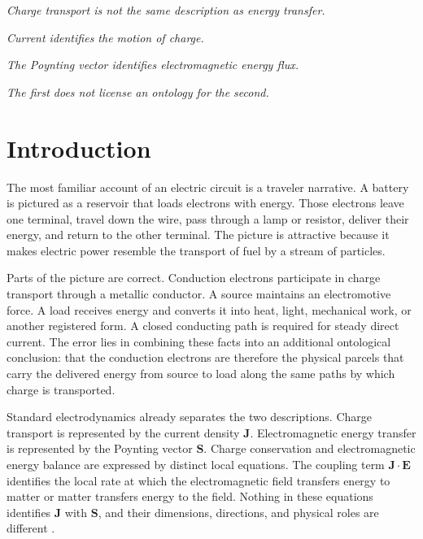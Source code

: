 \documentclass[12pt,onecolumn]{article}
\begin{document}

\begin{center}
\textit{Charge transport is not the same description as energy transfer.}

\vspace{0.4em}

\textit{Current identifies the motion of charge.}

\vspace{0.4em}

\textit{The Poynting vector identifies electromagnetic energy flux.}

\vspace{0.4em}

\textit{The first does not license an ontology for the second.}
\end{center}

\vspace{0.7em}

\clearpage
\tableofcontents
\clearpage

\section{Introduction}

The most familiar account of an electric circuit is a traveler narrative. A battery is pictured as a reservoir that loads electrons with energy. Those electrons leave one terminal, travel down the wire, pass through a lamp or resistor, deliver their energy, and return to the other terminal. The picture is attractive because it makes electric power resemble the transport of fuel by a stream of particles.

Parts of the picture are correct. Conduction electrons participate in charge transport through a metallic conductor. A source maintains an electromotive force. A load receives energy and converts it into heat, light, mechanical work, or another registered form. A closed conducting path is required for steady direct current. The error lies in combining these facts into an additional ontological conclusion: that the conduction electrons are therefore the physical parcels that carry the delivered energy from source to load along the same paths by which charge is transported.

Standard electrodynamics already separates the two descriptions. Charge transport is represented by the current density $\mathbf J$. Electromagnetic energy transfer is represented by the Poynting vector $\mathbf S$. Charge conservation and electromagnetic energy balance are expressed by distinct local equations. The coupling term $\mathbf J\cdot\mathbf E$ identifies the local rate at which the electromagnetic field transfers energy to matter or matter transfers energy to the field. Nothing in these equations identifies $\mathbf J$ with $\mathbf S$, and their dimensions, directions, and physical roles are different \cite{poynting1884,feynman,griffiths}.
\end{document}
